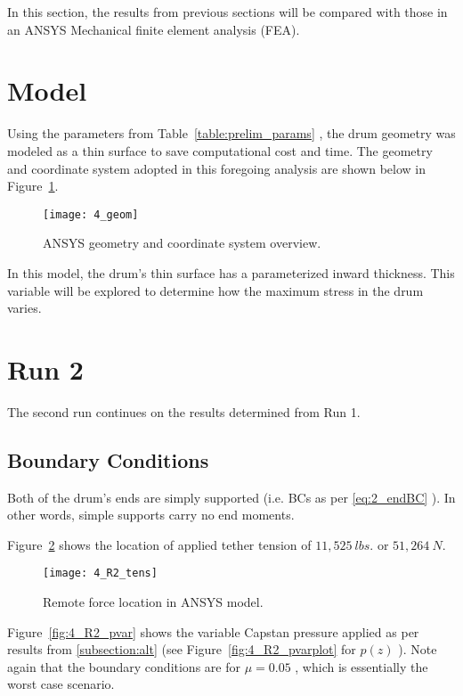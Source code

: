 In this section, the results from previous sections will be compared with those in an ANSYS Mechanical finite element analysis (FEA).

\section{Model}

Using the parameters from Table~\ref{table:prelim_params} , the drum geometry was modeled as a thin surface to save computational cost and time. The geometry and coordinate system adopted in this foregoing analysis are shown below in Figure~\ref{fig:4_geom}.

\begin{figure}[H]
	\centering
	\texttt{[image: 4\_geom]}
	\caption{ANSYS geometry and coordinate system overview.}
	\label{fig:4_geom}
\end{figure}

In this model, the drum's thin surface has a parameterized inward thickness. This variable will be explored to determine how the maximum stress in the drum varies.


\section{Run 2}

The second run continues on the results determined from Run 1.

\subsection{Boundary Conditions}

Both of the drum's ends are simply supported (i.e. BCs as per \ref{eq:2_endBC} ). In other words, simple supports carry no end moments.

Figure~\ref{fig:4_R2_tens} shows the location of applied tether tension of $11,525\ lbs.$ or $51,264\ N$.
\begin{figure}[H]
	\centering
	\texttt{[image: 4\_R2\_tens]}
	\caption{Remote force location in ANSYS model.}
	\label{fig:4_R2_tens}
\end{figure}

Figure~\ref{fig:4_R2_pvar} shows the variable Capstan pressure applied as per results from \ref{subsection:alt} (see Figure~\ref{fig:4_R2_pvarplot} for $p(z)$ ). Note again that the boundary conditions are for $\mu=0.05$ , which is essentially the worst case scenario.

